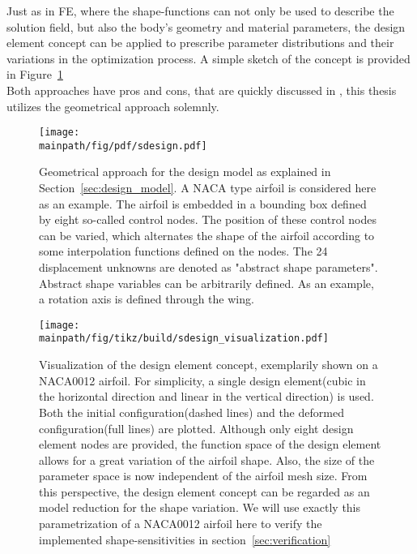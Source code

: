 \documentclass[../main.tex]{subfiles}
\begin{document}
Just as in \acf{FE}, where the shape-functions can not only be used to describe the solution field, but also the body's geometry and material parameters, the design element concept can be applied to prescribe parameter distributions and their variations in the optimization process. A simple sketch of the concept is provided in Figure~\ref{fig:sketch_geometrical_approach}
\\
Both approaches have pros and cons, that are quickly discussed in \cite{Maute2003}, this thesis utilizes the geometrical approach solemnly.

\begin{figure}[h!]
	\begin{center}
        \texttt{[image: \\mainpath/fig/pdf/sdesign.pdf]}
        \caption[Design-model: geometrical approach]{Geometrical approach for the design model as explained in Section~\ref{sec:design_model}. A NACA type airfoil is considered here as an example. The airfoil is embedded in a bounding box defined by eight so-called control nodes. The position of these control nodes can be varied, which alternates the shape of the airfoil according to some interpolation functions defined on the nodes. The 24 displacement unknowns are denoted as "abstract shape parameters". Abstract shape variables can be arbitrarily defined. As an example, a rotation axis is defined through the wing.}
		\label{fig:sketch_geometrical_approach}
    \end{center}
\end{figure}

\begin{figure}[h!]
	\begin{center}
        \texttt{[image: \\mainpath/fig/tikz/build/sdesign\_visualization.pdf]}
        \caption[Design element visualization]{Visualization of the design element concept, exemplarily shown on a NACA0012 airfoil. For simplicity, a single design element(cubic in the horizontal direction and linear in the vertical direction) is used. Both the initial configuration(dashed lines) and the deformed configuration(full lines) are plotted. Although only eight design element nodes are provided, the function space of the design element allows for a great variation of the airfoil shape. Also, the size of the parameter space is now independent of the airfoil mesh size. From this perspective, the design element concept can be regarded as an model reduction for the shape variation. We will use exactly this parametrization of a NACA0012 airfoil here to verify the implemented shape-sensitivities in section~\ref{sec:verification}}
		\label{designelement_concept_2D}
    \end{center}
\end{figure}
\end{document}
